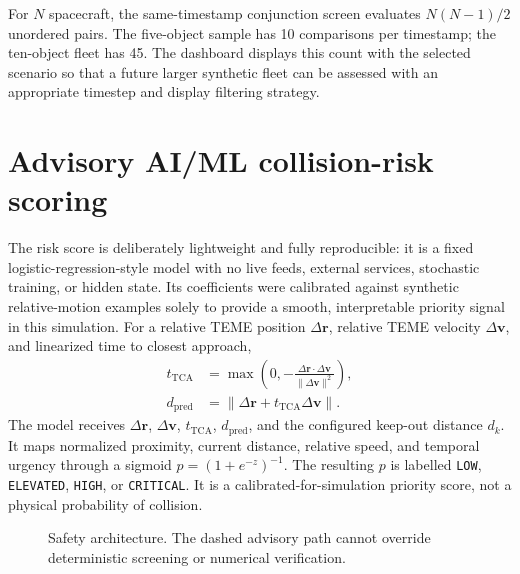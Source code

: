 \documentclass[11pt,a4paper]{article}
\begin{document}
For $N$ spacecraft, the same-timestamp conjunction screen evaluates $N(N-1)/2$ unordered pairs. The five-object sample has 10 comparisons per timestamp; the ten-object fleet has 45. The dashboard displays this count with the selected scenario so that a future larger synthetic fleet can be assessed with an appropriate timestep and display filtering strategy.

\section{Advisory AI/ML collision-risk scoring}
The risk score is deliberately lightweight and fully reproducible: it is a fixed logistic-regression-style model with no live feeds, external services, stochastic training, or hidden state. Its coefficients were calibrated against synthetic relative-motion examples solely to provide a smooth, interpretable priority signal in this simulation. For a relative TEME position $\Delta\mathbf r$, relative TEME velocity $\Delta\mathbf v$, and linearized time to closest approach,
\begin{align}
 t_{\mathrm{TCA}} &= \max\left(0,-\frac{\Delta\mathbf r\cdot\Delta\mathbf v}{\|\Delta\mathbf v\|^2}\right),\\
 d_{\mathrm{pred}} &= \|\Delta\mathbf r+t_{\mathrm{TCA}}\Delta\mathbf v\|.
\end{align}
The model receives $\Delta\mathbf r$, $\Delta\mathbf v$, $t_{\mathrm{TCA}}$, $d_{\mathrm{pred}}$, and the configured keep-out distance $d_k$. It maps normalized proximity, current distance, relative speed, and temporal urgency through a sigmoid $p=(1+e^{-z})^{-1}$. The resulting $p$ is labelled \texttt{LOW}, \texttt{ELEVATED}, \texttt{HIGH}, or \texttt{CRITICAL}. It is a calibrated-for-simulation priority score, not a physical probability of collision.

\begin{figure}[h]
\centering
{}
\caption{Safety architecture. The dashed advisory path cannot override deterministic screening or numerical verification.}
\end{figure}
\end{document}
